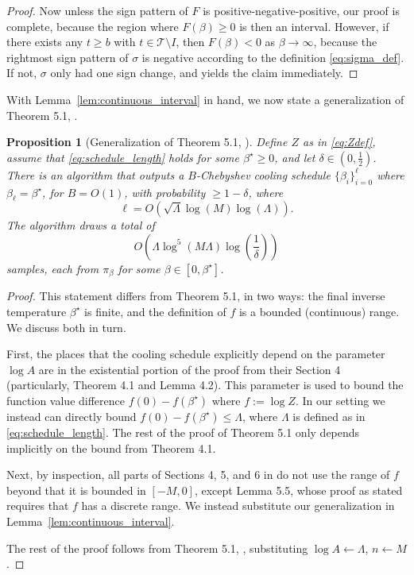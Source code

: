 \documentclass[11pt]{article}
\newtheorem{proposition}{Proposition}
\newcommand{\defeq}{:=}
\newcommand{\half}{\frac{1}{2}}
\newcommand{\1}{\mathbf{1}}
\newcommand{\0}{\mathbf{0}}
\newcommand{\Par}[1]{\left(#1\right)}
\newcommand{\calT}{{\mathcal{T}}}
\newcommand{\Lam}{\Lambda}
\begin{document}
\begin{proof}
Now unless the sign pattern of $F$ is positive-negative-positive, our proof is complete, because the region where $F(\beta) \ge 0$ is then an interval. However, if there exists any $t \ge b$ with $t \in \calT \setminus I$, then $F(\beta) < 0$ as $\beta \to \infty$, because the rightmost sign pattern of $\sigma$ is negative according to the definition \eqref{eq:sigma_def}. If not, $\sigma$ only had one sign change, and \cite{Tokarev11} yields the claim immediately.
\end{proof}

With Lemma~\ref{lem:continuous_interval} in hand, we now state a generalization of Theorem 5.1, \cite{StefankovicVV09}.

\begin{proposition}[Generalization of Theorem 5.1, \cite{StefankovicVV09}]\label{prop:svv}
Define $Z$ as in \eqref{eq:Zdef}, assume that \eqref{eq:schedule_length} holds for some $\beta^\star \ge 0$, and let $\delta \in (0, \half)$. There is an algorithm that outputs a $B$-Chebyshev cooling schedule $\{\beta_i\}_{i = 0}^\ell$ where $\beta_\ell = \beta^\star$, for $B = O(1)$, with probability $\ge 1 - \delta$, where
\[\ell = O\Par{\sqrt{\Lam}\log(M)\log(\Lam)}.\]
The algorithm draws a total of
\[O\Par{\Lam\log^5\Par{M\Lam}\log\Par{\frac 1 \delta}}\]
samples, each from $\pi_\beta$ for some $\beta \in [0, \beta^\star]$.
\end{proposition}
\begin{proof}
This statement differs from Theorem 5.1, \cite{StefankovicVV09} in two ways: the final inverse temperature $\beta^\star$ is finite, and the definition of $f$ is a bounded (continuous) range. We discuss both in turn.

First, the places that the cooling schedule explicitly depend on the parameter $\log A$ are in the existential portion of the proof from their Section 4 (particularly, Theorem 4.1 and Lemma 4.2). This parameter is used to bound the function value difference $f(0) - f(\beta^\star)$ where $f \defeq \log Z$. In our setting we instead can directly bound $f(0) - f(\beta^\star) \le \Lam$, where $\Lam$ is defined as in \eqref{eq:schedule_length}. The rest of the proof of Theorem 5.1 only depends implicitly on the bound from Theorem 4.1.

Next, by inspection, all parts of Sections 4, 5, and 6 in \cite{StefankovicVV09} do not use the range of $f$ beyond that it is bounded in $[-M, 0]$, except Lemma 5.5, whose proof as stated requires that $f$ has a discrete range. We instead substitute our generalization in Lemma~\ref{lem:continuous_interval}.

The rest of the proof follows from Theorem 5.1, \cite{StefankovicVV09}, substituting $\log A \gets \Lam$, $n \gets M$.
\end{proof}
\end{document}
